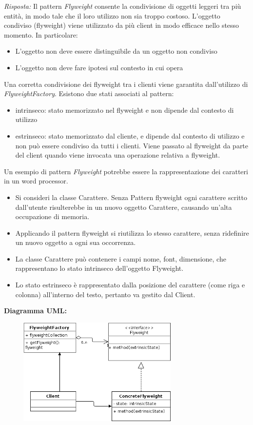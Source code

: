 \documentclass{article}
\newenvironment{solution}
    {\textit{Risposta:}}
    {}
\begin{document}
\begin{solution}
Il pattern \textit{Flyweight} consente la condivisione di oggetti leggeri tra più entità, in modo tale che il loro utilizzo non sia troppo costoso.
L'oggetto condiviso (flyweight) viene utilizzato da più client in modo efficace nello stesso momento.
In particolare:
\begin{itemize}
	\item L'oggetto non deve essere distinguibile da un oggetto non condiviso
	\item L'oggetto non deve fare ipotesi sul contesto in cui opera
\end{itemize}
Una corretta condivisione dei flyweight tra i clienti viene garantita dall'utilizzo di \textit{FlyweightFactory}.
Esistono due stati associati al pattern:
\begin{itemize}
	\item intrinseco: stato memorizzato nel flyweight e non dipende dal contesto di utilizzo
	\item estrinseco: stato memorizzato dal cliente, e dipende dal contesto di utilizzo e non può essere condiviso da tutti i clienti.
	Viene passato al flyweight da parte del client quando viene invocata una operazione relativa a flyweight.
\end{itemize}
Un esempio di pattern \textit{Flyweight} potrebbe essere la rappresentazione dei caratteri in un word processor.
\begin{itemize}
	\item Si consideri la classe Carattere. Senza Pattern flyweight ogni carattere scritto dall'utente risulterebbe in un nuovo oggetto Carattere, causando un'alta occupazione di memoria.
	\item Applicando il pattern flyweight si riutilizza lo stesso carattere, senza ridefinire un nuovo oggetto a ogni sua occorrenza.
	\item La classe Carattere può contenere i campi nome, font, dimensione, che rappresentano lo stato intrinseco dell'oggetto Flyweight.
	\item Lo stato estrinseco è rappresentato dalla posizione del carattere (come riga e colonna) all'interno del testo, pertanto va gestito dal Client.
\end{itemize}
\newpage
\textbf{Diagramma UML:}
\begin{figure}[htb!]
	\centering
	\label{FlyweightPattern}
	\includegraphics[width=8cm]{./immagini/flyweightPattern.png}
\end{figure}
\end{solution}
\end{document}
